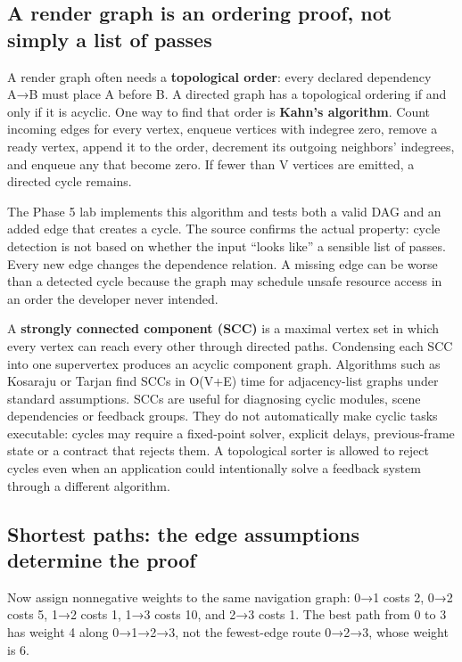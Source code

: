 \subsection{A render graph is an ordering proof, not simply a list of passes}\label{05-engine-i-ch008-a-render-graph-is-an-ordering-proof-not-simply-a-list-of-passes}

A render graph often needs a \textbf{topological order}: every declared dependency A→B must place A before B. A directed graph has a topological ordering if and only if it is acyclic. One way to find that order is \textbf{Kahn's algorithm}. Count incoming edges for every vertex, enqueue vertices with indegree zero, remove a ready vertex, append it to the order, decrement its outgoing neighbors' indegrees, and enqueue any that become zero. If fewer than V vertices are emitted, a directed cycle remains.

The Phase 5 lab implements this algorithm and tests both a valid DAG and an added edge that creates a cycle. The source confirms the actual property: cycle detection is not based on whether the input ``looks like'' a sensible list of passes. Every new edge changes the dependence relation. A missing edge can be worse than a detected cycle because the graph may schedule unsafe resource access in an order the developer never intended.

A \textbf{strongly connected component (SCC)} is a maximal vertex set in which every vertex can reach every other through directed paths. Condensing each SCC into one supervertex produces an acyclic component graph. Algorithms such as Kosaraju or Tarjan find SCCs in O(V+E) time for adjacency-list graphs under standard assumptions. SCCs are useful for diagnosing cyclic modules, scene dependencies or feedback groups. They do not automatically make cyclic tasks executable: cycles may require a fixed-point solver, explicit delays, previous-frame state or a contract that rejects them. A topological sorter is allowed to reject cycles even when an application could intentionally solve a feedback system through a different algorithm.

\subsection{Shortest paths: the edge assumptions determine the proof}\label{05-engine-i-ch008-shortest-paths-the-edge-assumptions-determine-the-proof}

Now assign nonnegative weights to the same navigation graph: 0→1 costs 2, 0→2 costs 5, 1→2 costs 1, 1→3 costs 10, and 2→3 costs 1. The best path from 0 to 3 has weight 4 along 0→1→2→3, not the fewest-edge route 0→2→3, whose weight is 6.

